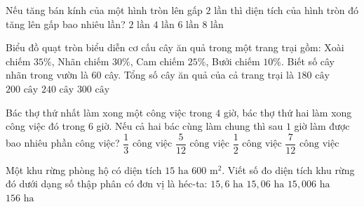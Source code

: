 \begin{ex} %
Nếu tăng bán kính của một hình tròn lên gấp $2$ lần thì diện tích của hình tròn đó tăng lên gấp bao nhiêu lần?
\choice
{$2\text{ lần}$}
{\True $4\text{ lần}$}
{$6\text{ lần}$}
{$8\text{ lần}$}
\end{ex}

\begin{ex} %
Biểu đồ quạt tròn biểu diễn cơ cấu cây ăn quả trong một trang trại gồm: Xoài chiếm $35\%$, Nhãn chiếm $30\%$, Cam chiếm $25\%$, Bưởi chiếm $10\%$. Biết số cây nhãn trong vườn là $60$ cây. Tổng số cây ăn quả của cả trang trại là
\choice
{$180\text{ cây}$}
{\True $200\text{ cây}$}
{$240\text{ cây}$}
{$300\text{ cây}$}
\end{ex}

\begin{ex} %
Bác thợ thứ nhất làm xong một công việc trong $4$ giờ, bác thợ thứ hai làm xong công việc đó trong $6$ giờ. Nếu cả hai bác cùng làm chung thì sau $1$ giờ làm được bao nhiêu phần công việc?
\choice
{$\dfrac{1}{3}\text{ công việc}$}
{\True $\dfrac{5}{12}\text{ công việc}$}
{$\dfrac{1}{2}\text{ công việc}$}
{$\dfrac{7}{12}\text{ công việc}$}
\end{ex}

\begin{ex} %
Một khu rừng phòng hộ có diện tích $15\text{ ha } 600\text{ m}^2$. Viết số đo diện tích khu rừng đó dưới dạng số thập phân có đơn vị là héc-ta:
\choice
{$15{,}6\text{ ha}$}
{\True $15{,}06\text{ ha}$}
{$15{,}006\text{ ha}$}
{$156\text{ ha}$}
\end{ex}

